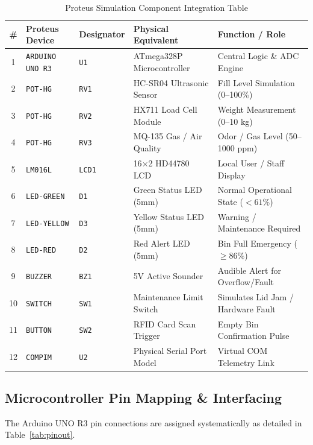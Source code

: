 \documentclass[12pt,a4paper]{article}
\begin{document}
\begin{table}[H]
\centering
\caption{Proteus Simulation Component Integration Table}
\label{tab:bom}
\small
\begin{tabular}{@{}cllll@{}}
\toprule
\textbf{\#} & \textbf{Proteus Device} & \textbf{Designator} & \textbf{Physical Equivalent} & \textbf{Function / Role} \\
\midrule
1 & \texttt{ARDUINO UNO R3} & \texttt{U1}  & ATmega328P Microcontroller & Central Logic \& ADC Engine \\
2 & \texttt{POT-HG}         & \texttt{RV1} & HC-SR04 Ultrasonic Sensor  & Fill Level Simulation (0--100\%) \\
3 & \texttt{POT-HG}         & \texttt{RV2} & HX711 Load Cell Module     & Weight Measurement (0--10 kg) \\
4 & \texttt{POT-HG}         & \texttt{RV3} & MQ-135 Gas / Air Quality   & Odor / Gas Level (50--1000 ppm) \\
5 & \texttt{LM016L}         & \texttt{LCD1}& 16$\times$2 HD44780 LCD    & Local User / Staff Display \\
6 & \texttt{LED-GREEN}      & \texttt{D1}  & Green Status LED (5mm)     & Normal Operational State ($<61\%$) \\
7 & \texttt{LED-YELLOW}     & \texttt{D3}  & Yellow Status LED (5mm)    & Warning / Maintenance Required \\
8 & \texttt{LED-RED}        & \texttt{D2}  & Red Alert LED (5mm)        & Bin Full Emergency ($\ge 86\%$) \\
9 & \texttt{BUZZER}         & \texttt{BZ1} & 5V Active Sounder           & Audible Alert for Overflow/Fault \\
10& \texttt{SWITCH}         & \texttt{SW1} & Maintenance Limit Switch   & Simulates Lid Jam / Hardware Fault \\
11& \texttt{BUTTON}         & \texttt{SW2} & RFID Card Scan Trigger     & Empty Bin Confirmation Pulse \\
12& \texttt{COMPIM}         & \texttt{U2}  & Physical Serial Port Model & Virtual COM Telemetry Link \\
\bottomrule
\end{tabular}
\end{table}

\subsection{Microcontroller Pin Mapping \& Interfacing}
The Arduino UNO R3 pin connections are assigned systematically as detailed in Table~\ref{tab:pinout}.
\end{document}
